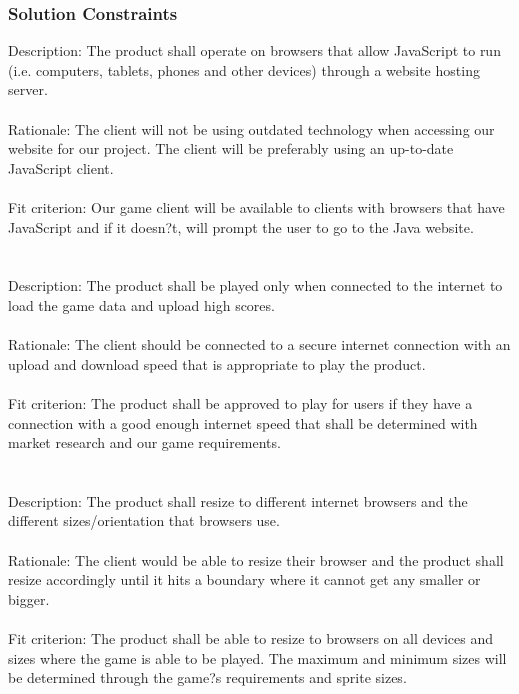\documentclass[11pt, oneside]{article}   	%
\begin{document}
\subsubsection*{Solution Constraints}
Description: The product shall operate on browsers that allow JavaScript to run (i.e. computers, tablets, phones and other devices) through a website hosting server.
\\
\\
Rationale: The client will not be using outdated technology when accessing our website for our project. The client will be preferably using an up-to-date JavaScript client. 
\\
\\
Fit criterion: Our game client will be available to clients with browsers that have JavaScript and if it doesn?t, will prompt the user to go to the Java website. 
\\
\\
\\
Description: The product shall be played only when connected to the internet to load the game data and upload high scores. 
\\
\\
Rationale: The client should be connected to a secure internet connection with an upload and download speed that is appropriate to play the product. 
\\
\\
Fit criterion: The product shall be approved to play for users if they have a connection with a good enough internet speed that shall be determined with market research and our game requirements.
\\
\\
\\
Description: The product shall resize to different internet browsers and the different sizes/orientation that browsers use.
\\
\\
Rationale: The client would be able to resize their browser and the product shall resize accordingly until it hits a boundary where it cannot get any smaller or bigger.
\\
\\
Fit criterion: The product shall be able to resize to browsers on all devices and sizes where the game is able to be played. The maximum and minimum sizes will be determined through the game?s requirements and sprite sizes.
\end{document}
